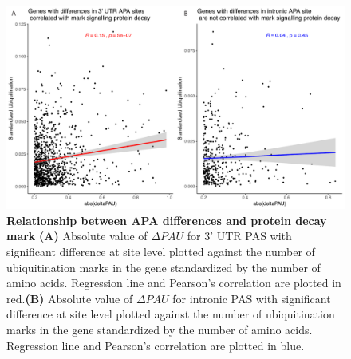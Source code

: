 \begin{figure}[!htb]
\centering
\includegraphics[width=5in]{img/ch03/Fig3-figSup2.pdf}
\caption[Relationship between APA differences and protein decay mark]{\textbf{Relationship between APA differences and protein decay mark} {\bf (A)} Absolute value of $\Delta PAU$ for 3' UTR PAS with significant difference at site level plotted against the number of ubiquitination marks in the gene standardized by the number of amino acids. Regression line and Pearson's correlation are plotted in red.{\bf (B)} Absolute value of $\Delta PAU$ for intronic PAS with significant difference at site level plotted against the number of ubiquitination marks in the gene standardized by the number of amino acids. Regression line and Pearson's correlation are plotted in blue.}
\label{fig:ch03-ubiq}
\end{figure}
\clearpage

